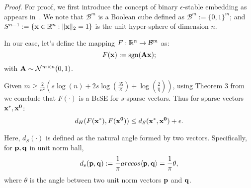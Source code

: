 \textit{Proof.} For proof, we first introduce the concept of binary $\epsilon$-stable embedding as appears in~\cite{Jacques2013}. We note that $\mathcal{B}^m$ is a Boolean cube defined as $\mathcal{B}^m := \{0,1\}^m$; and $S^{n-1}:=\{\mathbf{x}\in {\mathbb{R}}^n : \|\mathbf{x}\|_2 = 1\}$ is the unit hyper-sphere of dimension $n$.
 
In our case, let's define the mapping $F: {\mathbb{R}}^n \rightarrow \mathcal{B}^m$ as:
$$
F(\mathbf{x}):= \mathrm{sgn}(\mathbf{Ax});
$$
with $\mathbf{A} \sim \mathcal{N}^{m \times n}(0,1)$.

Given $m \geq \frac{2}{\kappa^2}\left(s\log{(n)} + 2s\log{\left(\frac{35}{\kappa}\right)}+\log{\left(\frac{2}{\eta}\right)}\right)$, using Theorem 3 from~\cite{Jacques2013} we conclude that $F(\cdot)$ is a B$\epsilon$SE for $s$-sparse vectors.
Thus for sparse vectors $\mathbf{x^*, x^0}$:
\begin{align}
\label{eq:th3}
d_H(F\mb{(x^*)},F\mb{(x^0)}) \leq d_S(\mb{x^*,x^0}) + \epsilon.
\end{align}

Here, $d_S(\cdot)$ is defined as the natural angle formed by two vectors. Specifically, for $\mathbf{p,q}$ in unit norm ball,
$$
d_s(\mathbf{p},\mathbf{q}) := \frac{1}{\pi}arccos\langle\mathbf{p},\mathbf{q}\rangle = \frac{1}{\pi}\theta,
$$
where $\theta$ is the angle between two unit norm vectors $\mathbf{p}$ and $\mathbf{q}$.


